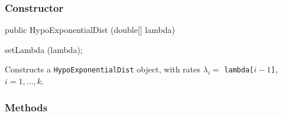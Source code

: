\subsubsection* {Constructor}

\begin{code}

   public HypoExponentialDist (double[] lambda)\begin{hide} {
      setLambda (lambda);
  }\end{hide}
\end{code}
\begin{tabb} Constructs a \texttt{HypoExponentialDist} object,
with rates $\lambda_i = $ \texttt{lambda[$i-1$]}, $i = 1,\ldots,k$.
\end{tabb}
\begin{htmlonly}
\end{htmlonly}


\subsubsection* {Methods}


